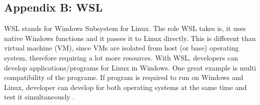 \subsection{Appendix B: WSL}
WSL stands for Windows Subsystem for Linux. The role WSL takes is, it uses native Windows functions and it passes it to Linux directly. This is different than virtual machine (VM), since VMs are isolated from host (or base) operating system, therefore requiring a lot more resources. 
With WSL, developers can develop applications/programs for Linux in Windows. One great example is multi compatibility of the programs. If program is required to run on Windows and Linux, developer can develop for both operating systems at the same time and test it simultaneously \parencite{web:AboutWSL}.